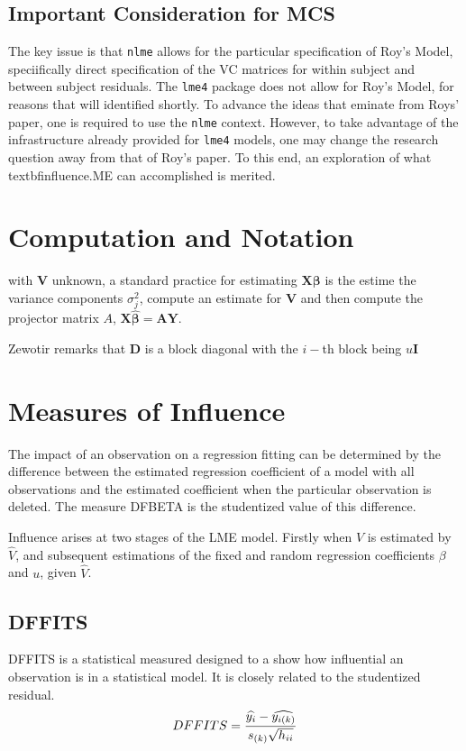 \documentclass[12pt, a4paper]{report}
\begin{document}
\subsection*{Important Consideration for MCS}

The key issue is that \texttt{nlme} allows for the particular specification of Roy's Model, speciifically direct specification of the VC matrices for within subject and between subject residuals.
The \texttt{lme4} package does not allow for Roy's Model, for reasons that will identified shortly.
To advance the ideas that eminate from Roys' paper, one is required to use the \texttt{nlme} context. However, to take advantage of the infrastructure already provided for \texttt{lme4} models, one may change the research question away from that of Roy's paper. 
To this end, an exploration of what textbf{influence.ME} can accomplished is merited.




\newpage
\section{Computation and Notation } %
with $\boldsymbol{V}$ unknown, a standard practice for estimating $\boldsymbol{X \beta}$ is the estime the variance components $\sigma^2_j$,
compute an estimate for $\boldsymbol{V}$ and then compute the projector matrix $A$, $\boldsymbol{X \hat{\beta}}  = \boldsymbol{AY}$.


Zewotir remarks that $\boldsymbol{D}$ is a block diagonal with the $i-$th block being $u \boldsymbol{I}$
\section{Measures of Influence} %

The impact of an observation on a regression fitting can be determined by the difference between the estimated regression coefficient of a model with all observations and the estimated coefficient when the particular observation is deleted. The measure DFBETA is the studentized value of this difference.

Influence arises at two stages of the LME model. Firstly when $V$ is estimated by $\hat{V}$, and subsequent
estimations of the fixed and random regression coefficients $\beta$ and $u$, given $\hat{V}$.


\subsection{DFFITS} %
DFFITS is a statistical measured designed to a show how influential an observation is in a statistical model. It is closely related to the studentized residual.
\begin{displaymath} DFFITS = {\widehat{y_i} -
	\widehat{y_{i(k)}} \over s_{(k)} \sqrt{h_{ii}}} \end{displaymath}
\end{document}
